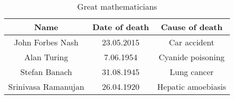\begin{table}[htbp]
    \centering
    \begin{tabular}{|c||c|c|}
        \hline
         Name & Date of death & Cause of death \\
         \hline \hline
         John Forbes Nash & 23.05.2015 & Car accident \\
         \hline
         Alan Turing & 7.06.1954 & Cyanide poisoning \\
         \hline
         Stefan Banach & 31.08.1945 & Lung cancer \\
         \hline
         Srinivasa Ramanujan & 26.04.1920 & Hepatic amoebiasis \\
         \hline
         
    \end{tabular}
    \caption{Great mathematicians}
    
    \label{tab:esarna}
\end{table}